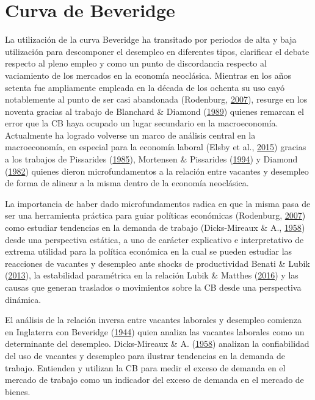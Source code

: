 \documentclass[12pt,oneside]{reedthesis}
\begin{document}
\hypertarget{fundamentos}{%
\chapter{Curva de Beveridge}\label{fundamentos}}

La utilización de la curva Beveridge ha transitado por periodos de alta y baja utilización para descomponer el desempleo en diferentes tipos, clarificar el debate respecto al pleno empleo y como un punto de discordancia respecto al vaciamiento de los mercados en la economía neoclásica. Mientras en los años setenta fue ampliamente empleada en la década de los ochenta su uso cayó notablemente al punto de ser casi abandonada (Rodenburg, \protect\hyperlink{ref-Rodenburg2007}{2007}), resurge en los noventa gracias al trabajo de Blanchard \& Diamond (\protect\hyperlink{ref-Blanchard1989}{1989}) quienes remarcan el error que la CB haya ocupado un lugar secundario en la macroeconomía. Actualmente ha logrado volverse un marco de análisis central en la macroeconomía, en especial para la economía laboral (Elsby et al., \protect\hyperlink{ref-Elsby2015}{2015}) gracias a los trabajos de Pissarides (\protect\hyperlink{ref-Pissarides1985}{1985}), Mortensen \& Pissarides (\protect\hyperlink{ref-Mortensen1994}{1994}) y Diamond (\protect\hyperlink{ref-Diamond1982}{1982}) quienes dieron microfundamentos a la relación entre vacantes y desempleo de forma de alinear a la misma dentro de la economía neoclásica.

La importancia de haber dado microfundamentos radica en que la misma pasa de ser una herramienta práctica para guiar políticas económicas (Rodenburg, \protect\hyperlink{ref-Rodenburg2007}{2007}) como estudiar tendencias en la demanda de trabajo (Dicks-Mireaux \& A., \protect\hyperlink{ref-Dicks-Mireaux1958}{1958}) desde una perspectiva estática, a uno de carácter explicativo e interpretativo de extrema utilidad para la política económica en la cual se pueden estudiar las reacciones de vacantes y desempleo ante shocks de productividad Benati \& Lubik (\protect\hyperlink{ref-Benati2013}{2013}), la estabilidad paramétrica en la relación Lubik \& Matthes (\protect\hyperlink{ref-Lubik2016}{2016}) y las causas que generan traslados o movimientos sobre la CB desde una perspectiva dinámica.

El análisis de la relación inversa entre vacantes laborales y desempleo comienza en Inglaterra con Beveridge (\protect\hyperlink{ref-Beveridge}{1944}) quien analiza las vacantes laborales como un determinante del desempleo. Dicks-Mireaux \& A. (\protect\hyperlink{ref-Dicks-Mireaux1958}{1958}) analizan la confiabilidad del uso de vacantes y desempleo para ilustrar tendencias en la demanda de trabajo. Entienden y utilizan la CB para medir el exceso de demanda en el mercado de trabajo como un indicador del exceso de demanda en el mercado de bienes.
\end{document}
